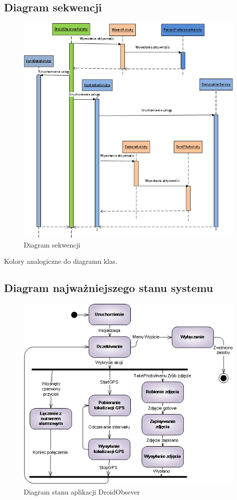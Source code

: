 \documentclass[11pt,a4paper]{article}
\begin{document}
\subsection {Diagram sekwencji}
\begin{figure}[h]
    \includegraphics[scale=0.7]{sequence.png}
    \caption{Diagram sekwencji}
 \end{figure}
Kolory analogiczne do diagramu klas.
\newpage
\subsection {Diagram najważniejszego stanu systemu}
\begin{figure}[h]
    \includegraphics[scale=0.7]{state.png}
    \caption{Diagram stanu aplikacji DroidObsever}
 \end{figure}
\newpage
\end{document}
